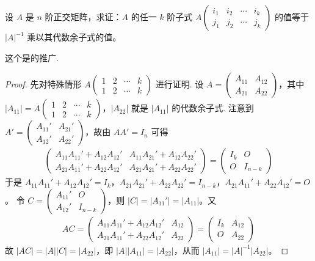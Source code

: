 \documentclass[../../main.tex]{subfiles}%
\begin{document}
\begin{proposition}\label{proposition:例9.45}
设 \(A\) 是 \(n\) 阶正交矩阵，求证：\(A\) 的任一 \(k\) 阶子式 \(A\begin{pmatrix}
i_1 & i_2 & \cdots & i_k \\
j_1 & j_2 & \cdots & j_k
\end{pmatrix}\) 的值等于 \(\vert A\vert^{-1}\) 乘以其代数余子式的值。
\end{proposition}
\begin{remark}
这个是的推广.
\end{remark}
\begin{proof}
先对特殊情形 \(A\begin{pmatrix}
1 & 2 & \cdots & k \\
1 & 2 & \cdots & k
\end{pmatrix}\) 进行证明. 设 \(A = \begin{pmatrix}
A_{11} & A_{12} \\
A_{21} & A_{22}
\end{pmatrix}\)，其中 \(\vert A_{11}\vert = A\begin{pmatrix}
1 & 2 & \cdots & k \\
1 & 2 & \cdots & k
\end{pmatrix}\)，\(\vert A_{22}\vert\) 就是 \(\vert A_{11}\vert\) 的代数余子式. 注意到 \(A' = \begin{pmatrix}
A_{11}' & A_{21}' \\
A_{12}' & A_{22}'
\end{pmatrix}\)，故由 \(AA' = I_n\) 可得
\begin{align*}
\begin{pmatrix}
A_{11}A_{11}' + A_{12}A_{12}' & A_{11}A_{21}' + A_{12}A_{22}' \\
A_{21}A_{11}' + A_{22}A_{12}' & A_{21}A_{21}' + A_{22}A_{22}'
\end{pmatrix} = \begin{pmatrix}
I_k & O \\
O & I_{n - k}
\end{pmatrix}
\end{align*}
于是
\(A_{11}A_{11}' + A_{12}A_{12}' = I_k\)，\(A_{21}A_{21}' + A_{22}A_{22}' = I_{n - k}\)，\(A_{21}A_{11}' + A_{22}A_{12}' = O\)。
令 \(C = \begin{pmatrix}
A_{11}' & O \\
A_{12}' & I_{n - k}
\end{pmatrix}\)，则 \(\vert C\vert = \vert A_{11}'\vert = \vert A_{11}\vert\)。又
\begin{align*}
AC = \begin{pmatrix}
A_{11}A_{11}' + A_{12}A_{12}' & A_{12} \\
A_{21}A_{11}' + A_{22}A_{12}' & A_{22}
\end{pmatrix} = \begin{pmatrix}
I_k & A_{12} \\
O & A_{22}
\end{pmatrix}
\end{align*}
故 \(\vert AC\vert = \vert A\vert\vert C\vert = \vert A_{22}\vert\)，即 \(\vert A\vert\vert A_{11}\vert = \vert A_{22}\vert\)，从而 \(\vert A_{11}\vert = \vert A\vert^{-1}\vert A_{22}\vert\)。


\end{proof}
\end{document}
